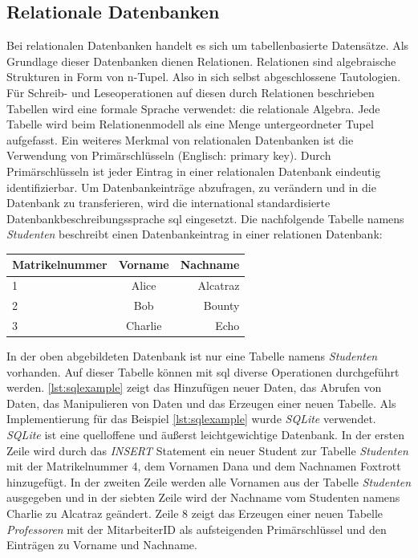\documentclass[titlepage]{report}
\begin{document}
\subsection*{Relationale Datenbanken}
Bei relationalen Datenbanken handelt es sich um tabellenbasierte Datensätze.
Als Grundlage dieser Datenbanken dienen Relationen. Relationen sind
algebraische Strukturen in Form von n\hyp{}Tupel. Also in sich selbst
abgeschlossene Tautologien. Für Schreib\hyp{} und Leseoperationen auf
diesen durch Relationen beschrieben Tabellen wird eine
formale Sprache verwendet: die relationale Algebra. Jede Tabelle wird beim
Relationenmodell als eine Menge untergeordneter Tupel aufgefasst\cite[S.
4]{MEIER2013}. Ein weiteres Merkmal von relationalen Datenbanken ist die
Verwendung von Primärschlüsseln (Englisch: primary key). Durch Primärschlüsseln
ist jeder Eintrag in einer relationalen Datenbank eindeutig identifizierbar. Um
Datenbankeinträge abzufragen, zu verändern und in die Datenbank zu
transferieren, wird die international standardisierte
Datenbankbeschreibungssprache \gls{sql} eingesetzt. Die nachfolgende Tabelle
namens \emph{Studenten} beschreibt einen Datenbankeintrag in einer relationen
Datenbank:
\begin{center}
    \begin{tabular}{l c r}
        \toprule
        Matrikelnummer & Vorname & Nachname \\
        \midrule
        1              & Alice   & Alcatraz \\
        2              & Bob     & Bounty   \\
        3              & Charlie & Echo     \\
        \bottomrule
    \end{tabular}
\end{center}
In der oben abgebildeten Datenbank ist nur eine Tabelle namens
\emph{Studenten} vorhanden. Auf dieser Tabelle können mit \gls{sql} diverse
Operationen durchgeführt werden. \autoref{lst:sqlexample} zeigt das Hinzufügen neuer
Daten, das Abrufen von Daten, das Manipulieren von Daten und das
Erzeugen einer neuen Tabelle. Als Implementierung für das Beispiel
\autoref{lst:sqlexample} wurde \emph{SQLite}
verwendet. \emph{SQLite} ist eine quelloffene und äußerst
leichtgewichtige Datenbank\cite{SQLITE}. In der ersten Zeile wird durch das \emph{INSERT} Statement
ein neuer Student zur Tabelle \emph{Studenten} mit der Matrikelnummer 4,
dem Vornamen Dana und dem Nachnamen Foxtrott hinzugefügt. In der zweiten
Zeile werden alle Vornamen aus der Tabelle \emph{Studenten}
ausgegeben und in der siebten Zeile wird der Nachname vom Studenten
namens Charlie zu Alcatraz geändert. Zeile 8 zeigt das Erzeugen einer
neuen Tabelle \emph{Professoren} mit der MitarbeiterID als
aufsteigenden Primärschlüssel und den Einträgen zu Vorname und Nachname.
\end{document}

